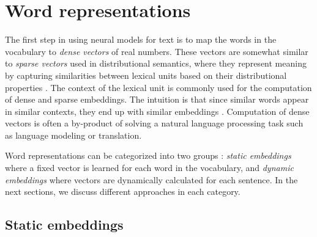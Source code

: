 \section{Word representations} \label{bgemb} 

The first step in using neural models for text is to map the words in the vocabulary to \textit{dense vectors} of real numbers.
These vectors are somewhat similar to \textit{sparse vectors} used in distributional semantics, where they represent meaning by capturing similarities between lexical units based on their distributional properties \citep{baroni-etal-2014-dont,baroni-lenci-2010-distributional}.
The context of the lexical unit is commonly used for the computation of dense and sparse embeddings.
The intuition is that since similar words appear in similar contexts, they end up with similar embeddings \citep{firth1957synopsis}.
Computation of dense vectors is often a by-product of solving a natural language processing task such as language modeling or translation. 

Word representations can be categorized into two groups \citep{Wang2019UsingDE}: \textit{static embeddings} where a fixed vector is learned for each word in the vocabulary, and \textit{dynamic embeddings} where vectors are dynamically calculated for each sentence. 
In the next sections, we discuss different approaches in each category.

\subsection{Static embeddings}  \label{bgembstatic} 

